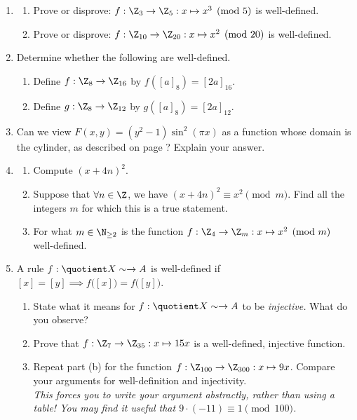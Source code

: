 \begin{enumerate}\renewcommand{\labelenumi}{\thesubsection.\theenumi}
	\item\begin{enumerate}
	  	\item Prove or disprove: $f:\Z_3\to\Z_5:x\mapsto x^3\pmod 5$ is well-defined.
			\item Prove or disprove: $f:\Z_{10}\to\Z_{20}:x\mapsto x^2\pmod{20}$ is well-defined.
		\end{enumerate}
		
	\item Determine whether the following are well-defined.
        \begin{enumerate}
            \item Define $f : \Z_8 \to \Z_{16}$ by $f([a]_8) = [2a]_{16}$.
            \item Define $g : \Z_8 \to \Z_{12}$ by $g([a]_8) = [2a]_{12}$.
        \end{enumerate}
		
	\item Can we view $F(x,y)=(y^2-1)\sin^2(\pi x)$ as a function whose domain is the cylinder, as described on page \pageref{subsec:cylinder}? Explain your answer. 

	\item\begin{enumerate}
	  	\item Compute $(x+4n)^2$.
	  	\item Suppose that $\forall n\in\Z$, we have $(x+4n)^2\equiv x^2\pmod m$. Find all the integers $m$ for which this is a true statement.
	  	\item For what $m\in\N_{\ge 2}$ is the function $f:\Z_4\to\Z_m:x\mapsto x^2\pmod m$ well-defined.
		\end{enumerate}
		
	\item A rule $f:\quotient X\sim\to A$ is well-defined if $[x]=[y]\implies f\bigl([x]\bigr)=f\bigl([y]\bigr)$.
	\begin{enumerate}
	  \item State what it means for $f:\quotient X\sim\to A$ to be \emph{injective.} What do you observe?
	  \item Prove that $f:\Z_7\to\Z_{35}:x\mapsto 15x$ is a well-defined, injective function.
	  \item Repeat part (b) for the function $f:\Z_{100}\to\Z_{300}:x\mapsto 9x$. Compare your arguments for well-definition and injectivity.\\
	  \emph{This forces you to write your argument abstractly, rather than using a table! You may find it useful that $9\cdot(-11)\equiv 1\pmod{100}$.}
	\end{enumerate}


\end{enumerate}
